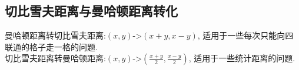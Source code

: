 \subsection{切比雪夫距离与曼哈顿距离转化}
曼哈顿距离转切比雪夫距离:$(x,y)$->$(x+y,x-y)$, 适用于一些每次只能向四联通的格子走一格的问题.\\
切比雪夫距离转曼哈顿距离:$(x,y)$->$(\frac{x+y}{2}, \frac{x-y}{2})$, 适用于一些统计距离的问题.
